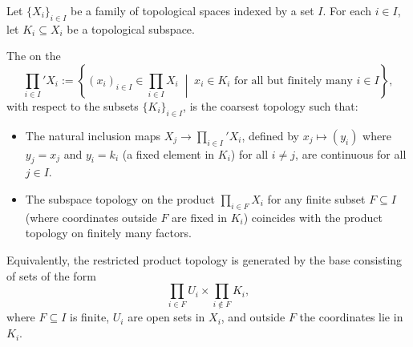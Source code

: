 \begin{definition}\label{definition:restricted_product_of_a_family_of_topological_spaces_with_respect_to_subspaces}
Let $\{X_i\}_{i \in I}$ be a family of topological spaces indexed by a set $I$. For each $i \in I$, let $K_i \subseteq X_i$ be a topological subspace.

The  on the 
$$ \prod_{i \in I}' X_i := \left\{ (x_i)_{i \in I} \in \prod_{i \in I} X_i \;\middle|\; x_i \in K_i \text{ for all but finitely many } i \in I \right\}, $$
with respect to the subsets $\{K_i\}_{i \in I}$, is the coarsest topology such that:
\begin{itemize}
    \item The natural inclusion maps $X_j \to \prod_{i \in I}' X_i$, defined by $x_j \mapsto (y_i)$ where $y_j = x_j$ and $y_i = k_i$ (a fixed element in $K_i$) for all $i \neq j$, are continuous for all $j \in I$.
    \item The subspace topology on the product $\prod_{i \in F} X_i$ for any finite subset $F \subseteq I$ (where coordinates outside $F$ are fixed in $K_i$) coincides with the product topology on finitely many factors.
\end{itemize}
Equivalently, the restricted product topology is generated by the base consisting of sets of the form
$$ \prod_{i \in F} U_i \times \prod_{i \notin F} K_i, $$
where $F \subseteq I$ is finite, $U_i$ are open sets in $X_i$, and outside $F$ the coordinates lie in $K_i$.
\end{definition}

